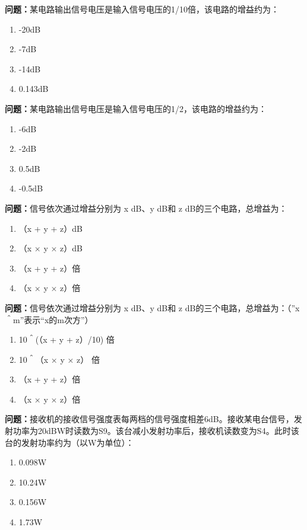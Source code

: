 \bigskip


\noindent\textbf{问题：}某电路输出信号电压是输入信号电压的1/10倍，该电路的增益约为：
\begin{enumerate}[label=\Alph*), leftmargin=3em]
\item -20dB
\item -7dB
\item -14dB
\item 0.143dB
\end{enumerate}

\bigskip


\noindent\textbf{问题：}某电路输出信号电压是输入信号电压的1/2，该电路的增益约为：
\begin{enumerate}[label=\Alph*), leftmargin=3em]
\item -6dB
\item -2dB
\item 0.5dB
\item -0.5dB
\end{enumerate}

\bigskip


\noindent\textbf{问题：}信号依次通过增益分别为 x dB、y dB和 z dB的三个电路，总增益为：
\begin{enumerate}[label=\Alph*), leftmargin=3em]
\item （x + y + z）dB
\item （x × y × z）dB
\item （x + y + z）倍
\item （x × y × z）倍
\end{enumerate}

\bigskip


\noindent\textbf{问题：}信号依次通过增益分别为 x dB、y dB和 z dB的三个电路，总增益为：（”x＾m”表示“x的m次方”）
\begin{enumerate}[label=\Alph*), leftmargin=3em]
\item 10＾(（x + y + z）/10) 倍
\item 10＾（x × y × z） 倍
\item （x + y + z）倍
\item （x × y × z）倍
\end{enumerate}

\bigskip


\noindent\textbf{问题：}接收机的接收信号强度表每两档的信号强度相差6dB。接收某电台信号，发射功率为20dBW时读数为S9。该台减小发射功率后，接收机读数变为S4。此时该台的发射功率约为（以W为单位）：
\begin{enumerate}[label=\Alph*), leftmargin=3em]
\item 0.098W
\item 10.24W
\item 0.156W
\item 1.73W
\end{enumerate}

